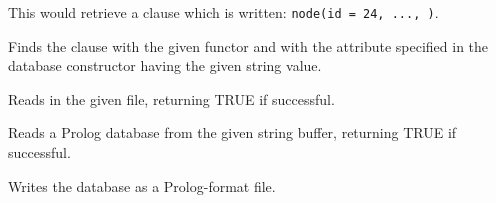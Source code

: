 This would retrieve a clause which is written: {\tt node(id = 24, ..., )}.


Finds the clause with the given functor and with the attribute specified
in the database constructor having the given string value.

\label{wxexprdatabaseread}


Reads in the given file, returning TRUE if successful.

\label{wxexprdatabasereadfromstring}


Reads a Prolog database from the given string buffer, returning TRUE if
successful.

\label{wxexprdatabasewrite}



Writes the database as a Prolog-format file.


